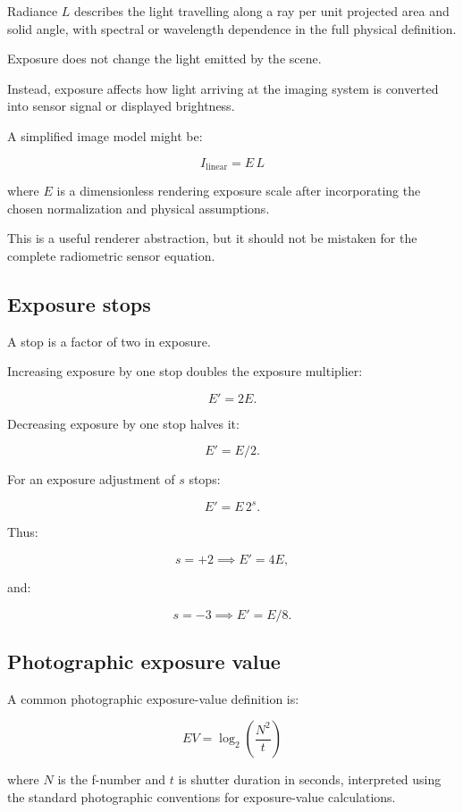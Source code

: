 Radiance \(L\) describes the light travelling along a ray per unit projected area and solid angle, with spectral or wavelength dependence in the full physical definition.

Exposure does not change the light emitted by the scene.

Instead, exposure affects how light arriving at the imaging system is converted into sensor signal or displayed brightness.

A simplified image model might be:

\[ \boxed{ I_{\mathrm{linear}}=E\,L } \]

where \(E\) is a dimensionless rendering exposure scale after incorporating the chosen normalization and physical assumptions.

This is a useful renderer abstraction, but it should not be mistaken for the complete radiometric sensor equation.

\subsection{Exposure stops}\label{02-foundations-ii-ch036-exposure-stops}

A stop is a factor of two in exposure.

Increasing exposure by one stop doubles the exposure multiplier:

\[ \boxed{E'=2E}. \]

Decreasing exposure by one stop halves it:

\[ \boxed{E'=E/2}. \]

For an exposure adjustment of \(s\) stops:

\[ \boxed{ E'=E\,2^s. } \]

Thus:

\[ s=+2\implies E'=4E, \]

and:

\[ s=-3\implies E'=E/8. \]

\subsection{Photographic exposure value}\label{02-foundations-ii-ch036-photographic-exposure-value}

A common photographic exposure-value definition is:

\[ \boxed{ EV=\log_2\left(\frac{N^2}{t}\right) } \]

where \(N\) is the f-number and \(t\) is shutter duration in seconds, interpreted using the standard photographic conventions for exposure-value calculations.

